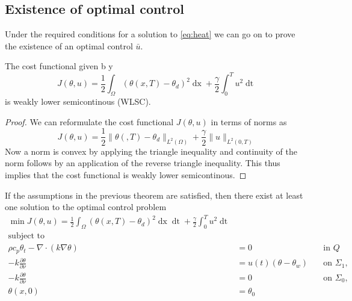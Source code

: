 \subsection{Existence of optimal control}
Under the required conditions for a solution to \eqref{eq:heat} we can go on to prove the existence of an optimal control $\bar{u}$. 

\begin{lemma}[WLSC]
    The cost functional given b y
    \begin{equation*}
         J(\theta, u) = \frac{1}{2} \int_\Omega (\theta(x, T) - \theta_d)^2 \mathop{dx} + \frac{\gamma}{2} \int_0^{T} u^2 \mathop{dt}
    \end{equation*}
    is weakly lower semicontinous (WLSC). 
\end{lemma}

\begin{proof}
We can reformulate the cost functional $J(\theta, u)$ in terms of norms as 
\begin{equation*}
    J(\theta, u) = \frac{1}{2}\|\theta (,T) - \theta_d \|_{L^2(\Omega)} + \frac{\gamma}{2}\|u\|_{L^2(0,T)}
\end{equation*}
Now a norm is convex by applying the triangle inequality and continuity of the norm follows by an application of the reverse triangle inequality. This thus implies that the cost functional is weakly lower semicontinous. 
\end{proof}

\begin{theorem}
If the assumptions in the previous theorem are satisfied, then there exist at least one solution to the optimal control problem 
\begin{align*}
       \min J(\theta, u) = \frac{1}{2} \int_\Omega (\theta(x, T) - \theta_d)^2 \mathop{dx} \mathop{dt} + \frac{\gamma}{2} \int_0^{T} u^2 \mathop{dt} \\
       \text{subject to} \\
       \rho c_p \theta_t - \nabla \cdot (k \nabla \theta) &= 0 \quad &\text{in } Q  \\
      -k \frac{\partial \theta}{\partial \nu} &= u(t) (\theta - \theta_w) \quad &\text{on } \Sigma_1, \\
      -k \frac{\partial \theta}{\partial \nu} &= 0 \quad &\text{on } \Sigma_0, \\
      \theta(x, 0) &= \theta_0 &
\end{align*}
\end{theorem}

